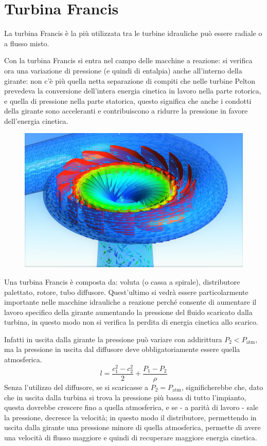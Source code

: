 \documentclass[a4paper, 15pt]{article}
\begin{document}
\newpage

\section{Turbina Francis}
\begin{adjustwidth}{2in}{}
	La turbina Francis è la più utilizzata tra le turbine idrauliche può essere radiale o a flusso misto. 
	
	Con la turbina Francis si entra nel campo delle macchine a reazione: si verifica ora una variazione di pressione (e quindi di entalpia) anche all'interno della girante: non c'è più quella netta separazione di compiti che nelle turbine Pelton prevedeva la conversione dell'intera energia cinetica in lavoro nella parte rotorica, e quella di pressione nella parte statorica, questo significa che anche i condotti della girante sono acceleranti e contribuiscono a ridurre la pressione in favore dell'energia cinetica. 
	\begin{figure}[H]
		\centering
		\includegraphics[width=0.5\linewidth]{immagini/turbinafrancis2}
		\label{fig:turbinafrancis2}
	\end{figure}	
	Una turbina Francis è composta da: voluta (o cassa a spirale), distributore palettato, rotore, tubo diffusore. Quest'ultimo si vedrà essere particolarmente importante nelle macchine idrauliche a reazione perché consente di aumentare il lavoro specifico della girante aumentando la pressione del fluido scaricato dalla turbina, in questo modo non si verifica la perdita di energia cinetica allo scarico. 
	
	Infatti in uscita dalla girante la pressione può variare con addirittura $P_2<P_{\text{atm}}$, ma la pressione in uscita dal diffusore deve obbligatoriamente essere quella atmosferica. 
	\[l = \dfrac{c_1^2-c_2^2}{2} + \dfrac{P_1-P_2}{\rho}\]	
	Senza l'utilizzo del diffusore, se si scaricasse a $P_2=P_{\text{atm}}$, significherebbe che, dato che in uscita dalla turbina si trova la pressione più bassa di tutto l'impianto, questa dovrebbe crescere fino a quella atmosferica, e se - a parità di lavoro - sale la pressione, decresce la velocità; in questo modo il distributore, permettendo in uscita dalla girante una pressione minore di quella atmosferica, permette di avere una velocità di flusso maggiore e quindi di recuperare maggiore energia cinetica. \newline 
	

\end{adjustwidth}
\end{document}
